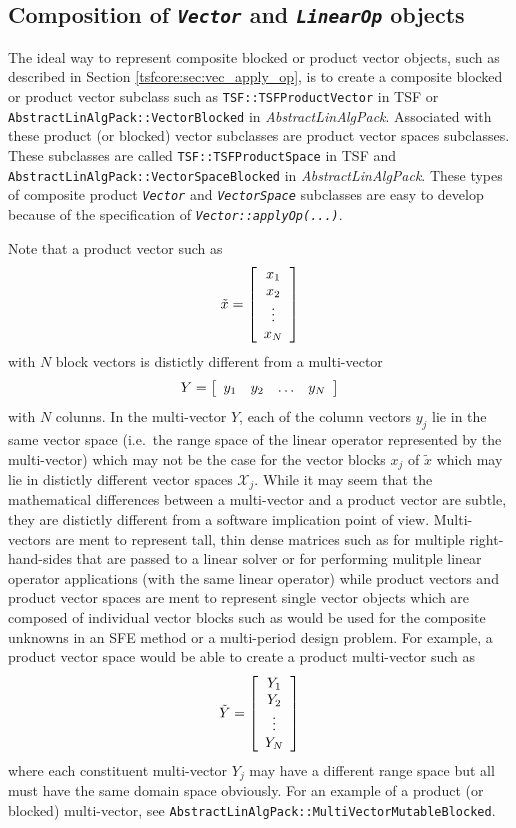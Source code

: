 %
\subsection{Composition of \texttt{\textit{Vector}} and \texttt{\textit{LinearOp}} objects}
\label{tsfcore:sec:composite_abstractions}
%

The ideal way to represent composite blocked or product vector
objects, such as described in Section \ref{tsfcore:sec:vec_apply_op},
is to create a composite blocked or product vector subclass such as
\texttt{TSF\-::TSF\-Product\-Vector} in TSF or
\texttt{Abstract\-Lin\-Alg\-Pack\-::Vector\-Blocked} in
\textit{Abstract\-Lin\-AlgP\-ack}.  Associated with these product
(or blocked) vector subclasses are product vector spaces subclasses.
These subclasses are called
\texttt{TSF\-::TSF\-Product\-Space} in TSF and
\texttt{Abstract\-Lin\-Alg\-Pack\-::Vector\-Space\-Blocked} in
\textit{Abstract\-Lin\-Alg\-Pack}.  These types of composite
product \texttt{\textit{Vector}} and \texttt{\textit{VectorSpace}}
subclasses are easy to develop because of the specification of
\texttt{\textit{Vector\-::applyOp(\-...)}}.

Note that a product vector such as
%
\[
\tilde{x} = {\bmat{c} x_1 \\ x_2 \\ \vdots \\ x_N \emat}
\]
%
with $N$ block vectors is distictly different from a multi-vector
%
\[
Y = {\bmat{cccc} y_1 & y_2 & \ldots & y_N \emat}
\]
%
with $N$ colunns.  In the multi-vector $Y$, each of the column vectors
$y_j$ lie in the same vector space (i.e.~the range space of the linear
operator represented by the multi-vector) which may not be the case
for the vector blocks $x_j$ of $\tilde{x}$ which may lie in distictly
different vector spaces $\mathcal{X}_j$.  While it may seem that the
mathematical differences between a multi-vector and a product vector
are subtle, they are distictly different from a software implication
point of view.  Multi-vectors are ment to represent tall, thin dense
matrices such as for multiple right-hand-sides that are passed to a
linear solver or for performing mulitple linear operator applications
(with the same linear operator) while product vectors and product
vector spaces are ment to represent single vector objects which are
composed of individual vector blocks such as would be used for the
composite unknowns in an SFE method or a multi-period design problem.
For example, a product vector space would be able to create a product
multi-vector such as
%
\[
\tilde{Y} = {\bmat{c} Y_1 \\ Y_2 \\ \vdots \\ Y_N \emat}
\]
%
where each constituent multi-vector $Y_j$ may have a different range
space but all must have the same domain space obviously.  For an
example of a product (or blocked) multi-vector, see
\texttt{Abstract\-Lin\-Alg\-Pack\-::Multi\-Vector\-Mutable\-Blocked}.

